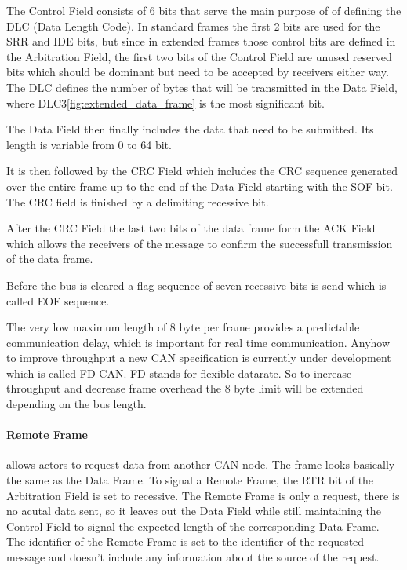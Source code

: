 	The Control Field consists of 6 bits that serve the main purpose of of defining
	the DLC (Data Length Code). In standard frames the first 2 bits are used for
	the SRR and IDE bits, but since in extended frames those control bits are
	defined in the Arbitration Field, the first two bits of the Control Field are
	unused reserved bits which should be dominant but need to be accepted by
	receivers either way. The DLC defines the number of bytes that will be
	transmitted in the Data Field, where DLC3\autoref{fig:extended_data_frame} is
	the most significant bit.
	
	The Data Field then finally includes the data that need to be submitted. Its
	length is variable from 0 to 64 bit. 
	
	It is then followed by the CRC Field which includes the CRC sequence generated
	over the entire frame up to the end of the Data Field starting with the SOF
	bit. The CRC field is finished by a delimiting recessive bit. 
	
	After the CRC Field the last two bits of the data frame form the ACK Field
	which allows the receivers of the message to confirm the
	successfull transmission of the data frame.
	
	Before the bus is cleared a flag sequence of seven recessive bits is send which
	is called EOF sequence.
	
	The very low maximum length of 8 byte per frame provides a predictable
	communication delay, which is important for real time communication. Anyhow
	to improve throughput a new CAN specification is currently under development
	which is called FD CAN. FD stands for flexible datarate. So to increase
	throughput and decrease frame overhead the 8 byte limit will be extended
	depending on the bus length. 
	 
	\paragraph{Remote Frame} allows actors to request data from another CAN node.
	The frame looks basically the same as the Data Frame. To signal a Remote
	Frame, the RTR bit of the Arbitration Field is set to recessive. The Remote
	Frame is only a request, there is no acutal data sent, so it leaves out the
    Data Field while still maintaining the Control Field to signal the expected
	length of the corresponding Data Frame.
	The identifier of the Remote Frame is set to the identifier of the requested
	message and doesn't include any information about the source of the request.
	
